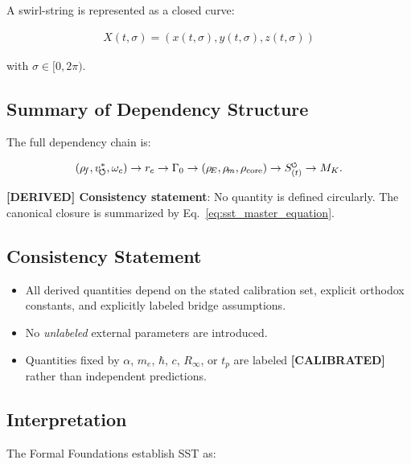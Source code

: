 \documentclass[11pt]{article}
\theoremstyle{definition}
\theoremstyle{plain}
\theoremstyle{remark}
\newcommand{\swirlarrow}{\mathchoice{\mkern-2mu\scriptstyle\boldsymbol{\circlearrowleft}}{\mkern-2mu\scriptstyle\boldsymbol{\circlearrowleft}}{\mkern-2mu\scriptscriptstyle\boldsymbol{\circlearrowleft}}{\mkern-2mu\scriptscriptstyle\boldsymbol{\circlearrowleft}}}
\newcommand{\rhoF}{{\rho_{\!f}}}
\newcommand{\rhoE}{\rho_{\!E}}
\newcommand{\rhoM}{\rho_{\!m}}
\newcommand{\rhocore}{\rho_{\mathrm{core}}}
\newcommand{\SwirlClock}{{S_{(t)}^{\swirlarrow}}}
\newcommand{\rc}{{r_c}}
\newcommand{\vchar}{v_{\!\boldsymbol{\circlearrowleft}}^{\ast}}
\begin{document}
        A swirl-string is represented as a closed curve:
        
        \begin{align}
            X(t,\sigma) = (x(t,\sigma), y(t,\sigma), z(t,\sigma))
        \end{align}
        
        with $\sigma \in [0,2\pi)$.
    
    \subsection{Summary of Dependency Structure}
        
        The full dependency chain is:
        
        \begin{align}
        (\rhoF, \vchar, \omega_c)
            \rightarrow \rc
            \rightarrow \Gamma_0
            \rightarrow (\rhoE, \rhoM, \rhocore)
            \rightarrow \SwirlClock
            \rightarrow M_K.
        \end{align}
        
        \textbf{[DERIVED] Consistency statement}:
        No quantity is defined circularly. The canonical closure is summarized by Eq.~\ref{eq:sst_master_equation}.
    
    \subsection{Consistency Statement}
        
        \begin{itemize}
            \item All derived quantities depend on the stated calibration set, explicit orthodox constants, and explicitly labeled bridge assumptions.
            \item No \emph{unlabeled} external parameters are introduced.
            \item Quantities fixed by $\alpha$, $m_e$, $\hbar$, $c$, $R_\infty$, or $t_p$ are labeled \textbf{[CALIBRATED]} rather than independent predictions.
        \end{itemize}
    
    \subsection{Interpretation}
        
        The Formal Foundations establish SST as:
        
\end{document}
